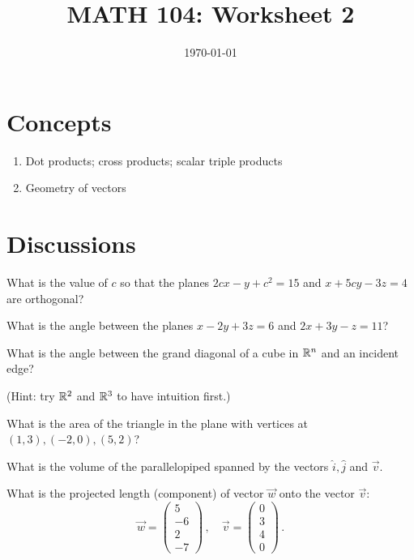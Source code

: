 \documentclass[12pt]{amsart}
\title{ MATH 104: Worksheet 2}
\author{}
\date{\today}
\begin{document}
\maketitle

\section{Concepts}

\begin{enumerate}
    \item Dot products; cross products; scalar triple products
    \item Geometry of vectors
\end{enumerate}

\section{Discussions}
\begin{question}
    What is the value of $c$ so that the planes
    $2cx - y + c^2 = 15$ and $x + 5cy - 3z = 4$ are orthogonal?
\end{question}

\begin{question}
    What is the angle between the planes $x - 2y + 3z = 6$ and $2x + 3y -z = 11$?
\end{question}

\begin{question}
    What is the angle between the grand diagonal of a cube in $\mathbb{R}^n$
    and an incident edge?

    (Hint: try $\mathbb{R}^2$ and $\mathbb{R}^3$ to have intuition first.)
\end{question}

\begin{question}
    What is the area of the triangle in the plane with vertices at
    $(1,3), (-2,0), (5,2)$?
\end{question}


\begin{question}
    What is the volume of the parallelopiped spanned by the vectors $\hat{i}, \hat{j}$ and $\vec{v}$.
\end{question}

\begin{question}
    What is the projected length (component) of vector $\vec{w}$ onto the vector $\vec{v}$:
    \begin{equation*}
        \vec{w} = \begin{pmatrix}
            5 \\ - 6 \\ 2 \\ -7
        \end{pmatrix}
        \,, \quad 
        \vec{v} =
        \begin{pmatrix}
            0 \\ 3 \\ 4 \\0
        \end{pmatrix}
        \,.
    \end{equation*}
\end{question}

\printbibliography 
%
%
\end{document}
